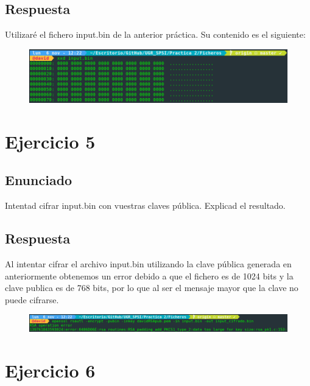 \documentclass[10pt,a4paper,spanish]{report}
\begin{document}
\section{Respuesta}
\noindent
Utilizaré el fichero input.bin de la anterior práctica. Su contenido es el siguiente:

\begin{figure}[!hbp]
 \centering  \includegraphics[width=1\textwidth]{./Imagenes/4.png}
\end{figure}

\chapter{Ejercicio 5}

\section{Enunciado}
\noindent
Intentad cifrar input.bin con vuestras claves pública. Explicad el resultado.

\section{Respuesta}
\noindent
Al intentar cifrar el archivo input.bin utilizando la clave pública generada en anteriormente obtenemos un error debido a que el fichero es de 1024 bits y la clave publica es de 768 bits, por lo que al ser el mensaje mayor que la clave no puede cifrarse.

\begin{figure}[!hbp]
 \centering  \includegraphics[width=1\textwidth]{./Imagenes/5.png}
\end{figure}

\chapter{Ejercicio 6}
\end{document}
